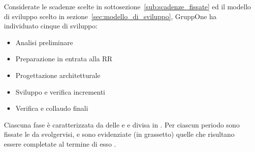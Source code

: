 \documentclass[../piano-di-progetto.tex]{subfiles}
\begin{document}
Considerate le scadenze scelte in sottosezione~\ref{sub:scadenze_fissate} ed il modello di sviluppo scelto in sezione~\ref{sec:modello_di_sviluppo}, GruppOne ha individuato cinque  di sviluppo:
\begin{itemize}
  \item Analisi preliminare
  \item Preparazione in entrata alla RR
  \item Progettazione architetturale
  \item Sviluppo e verifica incrementi
  \item Verifica e collaudo finali
\end{itemize}
Ciascuna fase è caratterizzata da delle  e  e divisa in .
Per ciascun periodo sono fissate le  da svolgervisi, e sono evidenziate (in grassetto) quelle che risultano essere completate al termine di esso .
\end{document}

